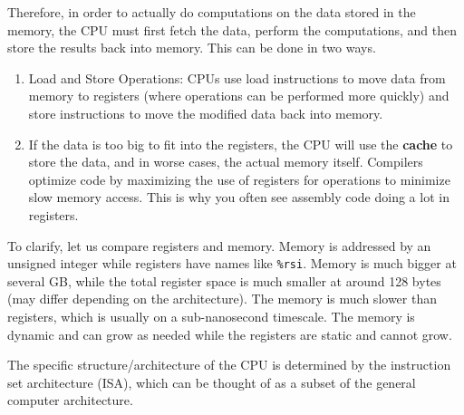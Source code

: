 \documentclass{article}
\begin{document}
    Therefore, in order to actually do computations on the data stored in the memory, the CPU must first fetch the data, perform the computations, and then store the results back into memory. This can be done in two ways.

    \begin{enumerate}
      \item Load and Store Operations: CPUs use load instructions to move data from memory to registers (where operations can be performed more quickly) and store instructions to move the modified data back into memory.
      \item If the data is too big to fit into the registers, the CPU will use the \textbf{cache} to store the data, and in worse cases, the actual memory itself. Compilers optimize code by maximizing the use of registers for operations to minimize slow memory access. This is why you often see assembly code doing a lot in registers.
    \end{enumerate}

    To clarify, let us compare registers and memory. Memory is addressed by an unsigned integer while registers have names like \texttt{\%rsi}. Memory is much bigger at several GB, while the total register space is much smaller at around 128 bytes (may differ depending on the architecture). The memory is much slower than registers, which is usually on a sub-nanosecond timescale. The memory is dynamic and can grow as needed while the registers are static and cannot grow.

    The specific structure/architecture of the CPU is determined by the instruction set architecture (ISA), which can be thought of as a subset of the general computer architecture. 
\end{document}
